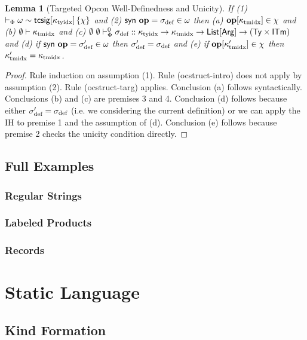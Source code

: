 \documentclass[12pt]{article}
\newtheorem{lemma}{Lemma}
\begin{document}
\begin{lemma}[Targeted Opcon Well-Definedness and Unicity]
If (1) $\vdash_\Phi \omega \sim {\sf tcsig}[\kappa_\text{tyidx}]\,\{\chi\}$ and (2) ${\sf syn}~\textbf{op}=\sigma_\text{def} \in \omega$ then (a) $\textbf{op}[\kappa_\text{tmidx}] \in \chi$ and (b) $\emptyset \vdash \kappa_\text{tmidx}$ and (c) $
    \emptyset~\emptyset \vdash_{\Phi}^{0} \sigma_\text{def} :: \kappa_\text{tyidx} \rightarrow \kappa_\text{tmidx} \rightarrow {\sf List}[{\sf Arg}] \rightarrow ({\sf Ty} \times {\sf ITm})$ and (d) if ${\sf syn}~\textbf{op}=\sigma_\text{def}' \in \omega$ then $\sigma_\text{def}'=\sigma_\text{def}$ and (e) if $\textbf{op}[\kappa_\text{tmidx}']\in\chi$ then $\kappa_\text{tmidx}'=\kappa_\text{tmidx}$.
\end{lemma}
\begin{proof}
Rule induction on assumption (1). Rule (ocstruct-intro) does not apply by assumption (2). Rule (ocstruct-targ) applies. Conclusion (a) follows syntactically. Conclusions (b) and (c) are premises 3 and 4. Conclusion (d) follows because either $\sigma_\text{def}'=\sigma_\text{def}$ (i.e. we considering the current definition) or we can apply the IH to premise 1 and the assumption of (d). Conclusion (e) follows because premise 2 checks the unicity condition directly.
\end{proof}


\subsection{Full Examples}
\subsubsection{Regular Strings}

\subsubsection{Labeled Products}

\subsubsection{Records}

\section{Static Language}
\subsection{Kind Formation}
\end{document}
